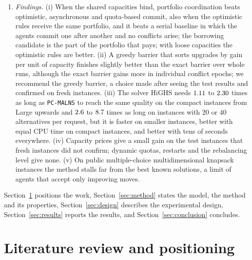 \documentclass[a4paper,fleqn]{cas-sc}
\newcommand{\pcm}{\texttt{PC-MALNS}}
\begin{document}
\begin{enumerate}[noitemsep]
    \item \textit{Findings.} (i) When the shared capacities bind, portfolio coordination beats optimistic, asynchronous and quota-based commit, also when the optimistic rules receive the same portfolio, and it beats a serial baseline in which the agents commit one after another and no conflicts arise; the borrowing candidate is the part of the portfolio that pays; with loose capacities the optimistic rules are better. (ii) A greedy barrier that sorts upgrades by gain per unit of capacity finishes slightly better than the exact barrier over whole runs, although the exact barrier gains more in individual conflict epochs; we recommend the greedy barrier, a choice made after seeing the test results and confirmed on fresh instances. (iii) The solver HiGHS needs $1.11$ to $2.30$ times as long as \pcm{} to reach the same quality on the compact instances from Large upwards and $2.6$ to $8.7$ times as long on instances with $20$ or $40$ alternatives per request, but it is faster on smaller instances, better with equal CPU time on compact instances, and better with tens of seconds everywhere. (iv) Capacity prices give a small gain on the test instances that fresh instances did not confirm; dynamic quotas, restarts and the rebalancing level give none. (v) On public multiple-choice multidimensional knapsack instances the method stalls far from the best known solutions, a limit of agents that accept only improving moves.
\end{enumerate}

Section~\ref{sec:literature} positions the work, Section~\ref{sec:method} states the model, the method and its properties, Section~\ref{sec:design} describes the experimental design, Section~\ref{sec:results} reports the results, and Section~\ref{sec:conclusion} concludes.

\section{Literature review and positioning}
\label{sec:literature}
\end{document}
